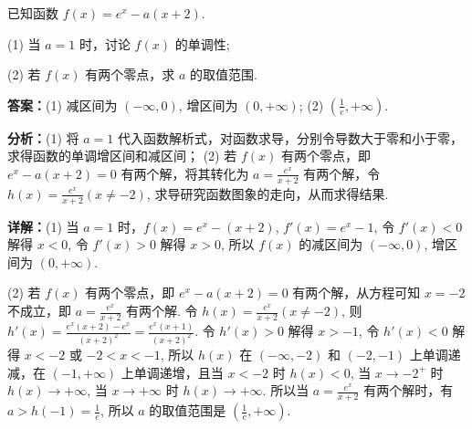 \begin{question}[points=12]
已知函数 $f(x) = e^x - a(x+2)$.



(1) 当 $a=1$ 时，讨论 $f(x)$ 的单调性;



(2) 若 $f(x)$ 有两个零点，求 $a$ 的取值范围.
\begin{solution}
\textbf{答案：}(1) 减区间为 $(-\infty, 0)$, 增区间为 $(0, +\infty)$; (2) $\left(\frac{1}{e}, +\infty\right)$.

\textbf{分析：}(1) 将 $a=1$ 代入函数解析式，对函数求导，分别令导数大于零和小于零，求得函数的单调增区间和减区间； (2) 若 $f(x)$ 有两个零点，即 $e^x - a(x+2)=0$ 有两个解，将其转化为 $a = \frac{e^x}{x+2}$ 有两个解，令 $h(x)=\frac{e^x}{x+2} (x\neq -2)$, 求导研究函数图象的走向，从而求得结果.

\textbf{详解：}(1) 当 $a=1$ 时，$f(x)=e^x-(x+2)$, $f'(x)=e^x-1$, 令 $f'(x)<0$ 解得 $x<0$, 令 $f'(x)>0$ 解得 $x>0$, 所以 $f(x)$ 的减区间为 $(-\infty,0)$, 增区间为 $(0,+\infty)$.

(2) 若 $f(x)$ 有两个零点，即 $e^x - a(x+2)=0$ 有两个解，从方程可知 $x=-2$ 不成立，即 $a = \frac{e^x}{x+2}$ 有两个解. 令 $h(x)=\frac{e^x}{x+2} (x\neq -2)$, 则 $h'(x)=\frac{e^x(x+2)-e^x}{(x+2)^2}=\frac{e^x(x+1)}{(x+2)^2}$. 令 $h'(x)>0$ 解得 $x>-1$, 令 $h'(x)<0$ 解得 $x<-2$ 或 $-2<x<-1$, 所以 $h(x)$ 在 $(-\infty,-2)$ 和 $(-2,-1)$ 上单调递减，在 $(-1,+\infty)$ 上单调递增，且当 $x<-2$ 时 $h(x)<0$, 当 $x\to -2^+$ 时 $h(x)\to +\infty$, 当 $x\to +\infty$ 时 $h(x)\to +\infty$. 所以当 $a = \frac{e^x}{x+2}$ 有两个解时，有 $a > h(-1) = \frac{1}{e}$, 所以 $a$ 的取值范围是 $\left(\frac{1}{e}, +\infty\right)$.
\end{solution}
\end{question}

